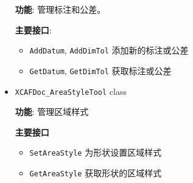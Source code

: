 \documentclass[11pt]{article}
\begin{document}
\begin{itemize}
\textbf{功能}: 管理标注和公差。

\textbf{主要接口}:

\begin{itemize}
\item \texttt{AddDatum}, \texttt{AddDimTol} 添加新的标注或公差
\item \texttt{GetDatum}, \texttt{GetDimTol} 获取标注或公差
\end{itemize}

\item \texttt{XCAFDoc\_AreaStyleTool} class

\textbf{功能}: 管理区域样式

\textbf{主要接口}

\begin{itemize}
\item \texttt{SetAreaStyle} 为形状设置区域样式
\item \texttt{GetAreaStyle} 获取形状的区域样式
\end{itemize}
\end{itemize}
\end{document}
